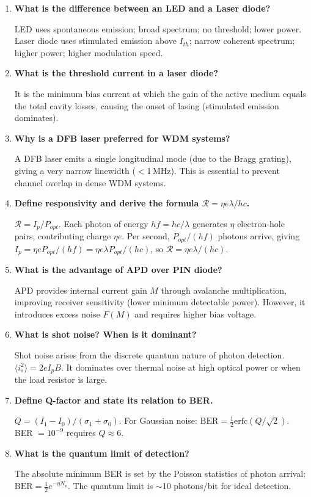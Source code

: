 \documentclass[12pt,a4paper]{article}
\newcommand{\Q}[1]{\textbf{#1}\par\noindent\ignorespaces}
\begin{document}
\begin{tcolorbox}[exambox, title={\textbf{Frequently Asked / Viva Questions}}]
\begin{enumerate}[topsep=0pt, label=\textbf{Q\arabic*.}, itemsep=5pt]
  \item \Q{What is the difference between an LED and a Laser diode?}
    LED uses spontaneous emission; broad spectrum; no threshold; lower power. Laser diode uses stimulated emission above $I_{th}$; narrow coherent spectrum; higher power; higher modulation speed.
  \item \Q{What is the threshold current in a laser diode?}
    It is the minimum bias current at which the gain of the active medium equals the total cavity losses, causing the onset of lasing (stimulated emission dominates).
  \item \Q{Why is a DFB laser preferred for WDM systems?}
    A DFB laser emits a single longitudinal mode (due to the Bragg grating), giving a very narrow linewidth ($<$1\,MHz). This is essential to prevent channel overlap in dense WDM systems.
  \item \Q{Define responsivity and derive the formula $\mathcal{R} = \eta e\lambda/hc$.}
    $\mathcal{R} = I_p/P_{opt}$. Each photon of energy $hf = hc/\lambda$ generates $\eta$ electron-hole pairs, contributing charge $\eta e$. Per second, $P_{opt}/(hf)$ photons arrive, giving $I_p = \eta e P_{opt}/(hf) = \eta e\lambda P_{opt}/(hc)$, so $\mathcal{R} = \eta e\lambda/(hc)$.
  \item \Q{What is the advantage of APD over PIN diode?}
    APD provides internal current gain $M$ through avalanche multiplication, improving receiver sensitivity (lower minimum detectable power). However, it introduces excess noise $F(M)$ and requires higher bias voltage.
  \item \Q{What is shot noise? When is it dominant?}
    Shot noise arises from the discrete quantum nature of photon detection. $\langle i_s^2 \rangle = 2eI_p B$. It dominates over thermal noise at high optical power or when the load resistor is large.
  \item \Q{Define Q-factor and state its relation to BER.}
    $Q = (I_1 - I_0)/(\sigma_1 + \sigma_0)$. For Gaussian noise: $\text{BER} = \frac{1}{2}\text{erfc}(Q/\sqrt{2})$. BER $= 10^{-9}$ requires $Q \approx 6$.
  \item \Q{What is the quantum limit of detection?}
    The absolute minimum BER is set by the Poisson statistics of photon arrival: $\text{BER} = \frac{1}{2}e^{-\eta N_p}$. The quantum limit is $\sim$10 photons/bit for ideal detection.

\end{enumerate}
\end{tcolorbox}
\end{document}
